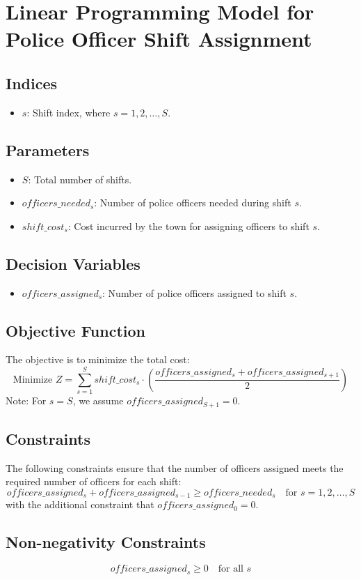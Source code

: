 \documentclass{article}
\begin{document}
\section*{Linear Programming Model for Police Officer Shift Assignment}

\subsection*{Indices}
\begin{itemize}
    \item $s$: Shift index, where $s = 1, 2, \ldots, S$.
\end{itemize}

\subsection*{Parameters}
\begin{itemize}
    \item $S$: Total number of shifts.
    \item $officers\_needed_{s}$: Number of police officers needed during shift $s$.
    \item $shift\_cost_{s}$: Cost incurred by the town for assigning officers to shift $s$.
\end{itemize}

\subsection*{Decision Variables}
\begin{itemize}
    \item $officers\_assigned_{s}$: Number of police officers assigned to shift $s$.
\end{itemize}

\subsection*{Objective Function}
The objective is to minimize the total cost:
\[
\text{Minimize } Z = \sum_{s=1}^{S} shift\_cost_{s} \cdot \left( \frac{officers\_assigned_{s} + officers\_assigned_{s+1}}{2} \right)
\]
Note: For $s = S$, we assume $officers\_assigned_{S+1} = 0$.

\subsection*{Constraints}
The following constraints ensure that the number of officers assigned meets the required number of officers for each shift:
\[
officers\_assigned_{s} + officers\_assigned_{s-1} \geq officers\_needed_{s} \quad \text{for } s = 1, 2, \ldots, S
\]
with the additional constraint that $officers\_assigned_{0} = 0$.

\subsection*{Non-negativity Constraints}
\[
officers\_assigned_{s} \geq 0 \quad \text{for all } s
\]
\end{document}
